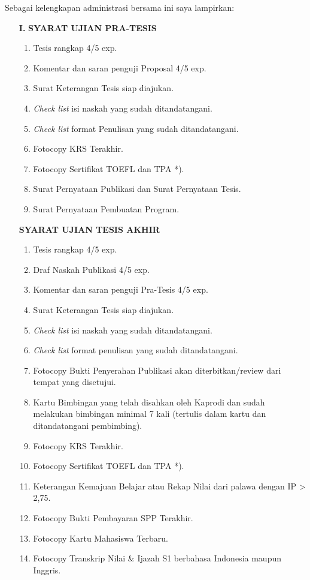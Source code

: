 \vspace{.2cm}
\noindent
Sebagai kelengkapan administrasi bersama ini saya lampirkan:
\begin{enumerate}
	\item[\textbf{I.}] \textbf{SYARAT UJIAN PRA-TESIS}
	\begin{enumerate}
		\setlength\itemsep{0.1mm}
		\item Tesis rangkap 4/5 exp.
		\item Komentar dan saran penguji Proposal 4/5 exp.
		\item Surat Keterangan Tesis siap diajukan.
		\item \textit{Check list} isi naskah yang sudah ditandatangani.
		\item \textit{Check list} format Penulisan yang sudah ditandatangani.
		\item Fotocopy KRS Terakhir.
		\item Fotocopy Sertifikat TOEFL dan TPA *).
		\item Surat Pernyataan Publikasi dan Surat Pernyataan Tesis.
		\item Surat Pernyataan Pembuatan Program.
	\end{enumerate}
	\item[\textbf{\circled{II.}}] \textbf{SYARAT UJIAN TESIS AKHIR}
	\begin{enumerate}
		\setlength\itemsep{0.1mm}
		\item Tesis rangkap 4/5 exp.
		\item Draf Naskah Publikasi 4/5 exp.
		\item Komentar dan saran penguji Pra-Tesis 4/5 exp.
		\item Surat Keterangan Tesis siap diajukan.
		\item \textit{Check list} isi naskah yang sudah ditandatangani.
		\item \textit{Check list} format penulisan yang sudah ditandatangani.
		\item Fotocopy Bukti Penyerahan Publikasi akan diterbitkan/review dari tempat yang disetujui.
		\item Kartu Bimbingan yang telah disahkan oleh Kaprodi dan sudah melakukan bimbingan minimal 7 kali (tertulis dalam kartu dan ditandatangani pembimbing).
		\item Fotocopy KRS Terakhir.
		\item Fotocopy Sertifikat TOEFL dan TPA *).
		\item Keterangan Kemajuan Belajar atau Rekap Nilai dari palawa dengan  IP > 2,75.
		\item Fotocopy Bukti Pembayaran SPP Terakhir.
		\item Fotocopy Kartu Mahasiswa Terbaru.
		\item Fotocopy Transkrip Nilai \& Ijazah S1 berbahasa Indonesia maupun Inggris.
	\end{enumerate}
\end{enumerate}

